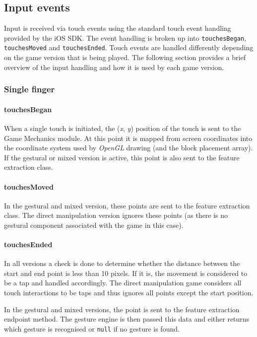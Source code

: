 \subsection{Input events}
Input is received via touch events using the standard touch event handling provided by the iOS SDK. The event handling is broken up into \texttt{touchesBegan}, \texttt{touchesMoved} and \texttt{touchesEnded}. Touch events are handled differently depending on the game version that is being played. The following section provides a brief overview of the input handling and how it is used by each game version.

\subsubsection{Single finger}
\paragraph{touchesBegan}
When a single touch is initiated, the (\emph{x}, \emph{y}) position of the touch is sent to the Game Mechanics module. At this point it is mapped from screen coordinates into the coordinate system used by \emph{OpenGL} drawing (and the block placement array). If the gestural or mixed version is active, this point is also sent to the feature extraction class.

\paragraph{touchesMoved}
In the gestural and mixed version, these points are sent to the feature extraction class. The direct manipulation version ignores these points (as there is no gestural component associated with the game in this case).

\paragraph{touchesEnded}
In all versions a check is done to determine whether the distance between the start and end point is less than 10 pixels. If it is, the movement is considered to be a tap and handled accordingly. The direct manipulation game considers all touch interactions to be taps and thus ignores all points except the start position.

In the gestural and mixed versions, the point is sent to the feature extraction endpoint method. The gesture engine is then passed this data and either returns which gesture is recognised or \texttt{null} if no gesture is found.

